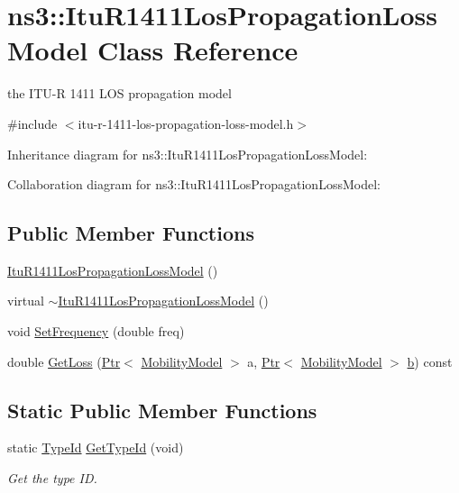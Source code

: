 \hypertarget{classns3_1_1ItuR1411LosPropagationLossModel}{}\section{ns3\+:\+:Itu\+R1411\+Los\+Propagation\+Loss\+Model Class Reference}
\label{classns3_1_1ItuR1411LosPropagationLossModel}


the I\+T\+U-\/R 1411 L\+OS propagation model  




{\ttfamily \#include $<$itu-\/r-\/1411-\/los-\/propagation-\/loss-\/model.\+h$>$}



Inheritance diagram for ns3\+:\+:Itu\+R1411\+Los\+Propagation\+Loss\+Model\+:


Collaboration diagram for ns3\+:\+:Itu\+R1411\+Los\+Propagation\+Loss\+Model\+:
\subsection*{Public Member Functions}
\begin{DoxyCompactItemize}
\item 
\hyperlink{classns3_1_1ItuR1411LosPropagationLossModel_a03327b3eb2073296f3b2cd72a65a089e}{Itu\+R1411\+Los\+Propagation\+Loss\+Model} ()
\item 
virtual \hyperlink{classns3_1_1ItuR1411LosPropagationLossModel_a2baa37f59f2bea5bcebd20672df754c6}{$\sim$\+Itu\+R1411\+Los\+Propagation\+Loss\+Model} ()
\item 
void \hyperlink{classns3_1_1ItuR1411LosPropagationLossModel_a335848e3e4eec8bc8cae65611276ed64}{Set\+Frequency} (double freq)
\item 
double \hyperlink{classns3_1_1ItuR1411LosPropagationLossModel_ad194a5751273291ef168cafa0efc9ca6}{Get\+Loss} (\hyperlink{classns3_1_1Ptr}{Ptr}$<$ \hyperlink{classns3_1_1MobilityModel}{Mobility\+Model} $>$ a, \hyperlink{classns3_1_1Ptr}{Ptr}$<$ \hyperlink{classns3_1_1MobilityModel}{Mobility\+Model} $>$ \hyperlink{lte__pathloss_8m_a21ad0bd836b90d08f4cf640b4c298e7c}{b}) const 
\end{DoxyCompactItemize}
\subsection*{Static Public Member Functions}
\begin{DoxyCompactItemize}
\item 
static \hyperlink{classns3_1_1TypeId}{Type\+Id} \hyperlink{classns3_1_1ItuR1411LosPropagationLossModel_a6c83e47bedbe844b72f8c1615122de4b}{Get\+Type\+Id} (void)
\begin{DoxyCompactList}\small\item\em Get the type ID. \end{DoxyCompactList}\end{DoxyCompactItemize}
